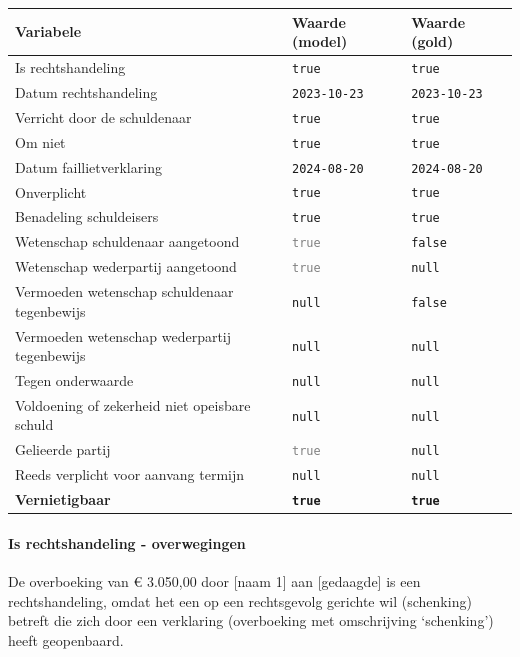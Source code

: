 \documentclass[
  dutch,
  a4paper,
]{article}
\begin{document}
\begin{center}
\small
\begin{tabular}{@{}p{7.4cm}p{2.6cm}p{2.6cm}@{}}
\toprule
Variabele & Waarde (model) & Waarde (gold) \\
\midrule
Is rechtshandeling & \texttt{true} & \texttt{true} \\
Datum rechtshandeling & \texttt{2023-10-23} & \texttt{2023-10-23} \\
Verricht door de schuldenaar & \texttt{true} & \texttt{true} \\
Om niet & \texttt{true} & \texttt{true} \\
Datum faillietverklaring & \texttt{2024-08-20} & \texttt{2024-08-20} \\
Onverplicht & \texttt{true} & \texttt{true} \\
Benadeling schuldeisers & \texttt{true} & \texttt{true} \\
Wetenschap schuldenaar aangetoond & \textcolor{gray}{\texttt{true}} & \texttt{false} \\
Wetenschap wederpartij aangetoond & \textcolor{gray}{\texttt{true}} & \texttt{null} \\
Vermoeden wetenschap schuldenaar tegenbewijs & \texttt{null} & \texttt{false} \\
Vermoeden wetenschap wederpartij tegenbewijs & \texttt{null} & \texttt{null} \\
Tegen onderwaarde & \texttt{null} & \texttt{null} \\
Voldoening of zekerheid niet opeisbare schuld & \texttt{null} & \texttt{null} \\
Gelieerde partij & \textcolor{gray}{\texttt{true}} & \texttt{null} \\
Reeds verplicht voor aanvang termijn & \texttt{null} & \texttt{null} \\
\textbf{Vernietigbaar} & \textbf{\texttt{true}} & \textbf{\texttt{true}} \\
\bottomrule
\end{tabular}
\end{center}

\paragraph{Is rechtshandeling - overwegingen}\label{is-rechtshandeling---overwegingen-30}

De overboeking van € 3.050,00 door {[}naam 1{]} aan {[}gedaagde{]} is een rechtshandeling, omdat het een op een rechtsgevolg gerichte wil (schenking) betreft die zich door een verklaring (overboeking met omschrijving `schenking') heeft geopenbaard.
\end{document}
